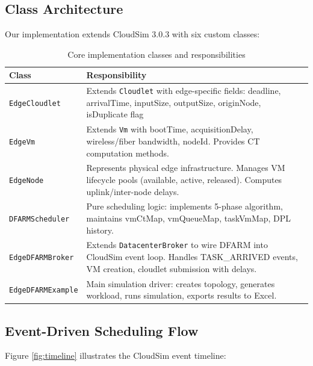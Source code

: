 \documentclass[12pt]{report}
\begin{document}
\subsection{Class Architecture}

Our implementation extends CloudSim 3.0.3 with six custom classes:

\begin{table}[H]
\centering
\caption{Core implementation classes and responsibilities}
\label{tab:classes}
\begin{tabular}{p{4cm}p{10cm}}
\toprule
\textbf{Class} & \textbf{Responsibility} \\
\midrule
\texttt{EdgeCloudlet} & Extends \texttt{Cloudlet} with edge-specific fields: deadline, arrivalTime, inputSize, outputSize, originNode, isDuplicate flag \\
\midrule
\texttt{EdgeVm} & Extends \texttt{Vm} with bootTime, acquisitionDelay, wireless/fiber bandwidth, nodeId. Provides CT computation methods. \\
\midrule
\texttt{EdgeNode} & Represents physical edge infrastructure. Manages VM lifecycle pools (available, active, released). Computes uplink/inter-node delays. \\
\midrule
\texttt{DFARMScheduler} & Pure scheduling logic: implements 5-phase algorithm, maintains vmCtMap, vmQueueMap, taskVmMap, DPL history. \\
\midrule
\texttt{EdgeDFARMBroker} & Extends \texttt{DatacenterBroker} to wire DFARM into CloudSim event loop. Handles TASK\_ARRIVED events, VM creation, cloudlet submission with delays. \\
\midrule
\texttt{EdgeDFARMExample} & Main simulation driver: creates topology, generates workload, runs simulation, exports results to Excel. \\
\bottomrule
\end{tabular}
\end{table}

\subsection{Event-Driven Scheduling Flow}

Figure \ref{fig:timeline} illustrates the CloudSim event timeline:
\end{document}
